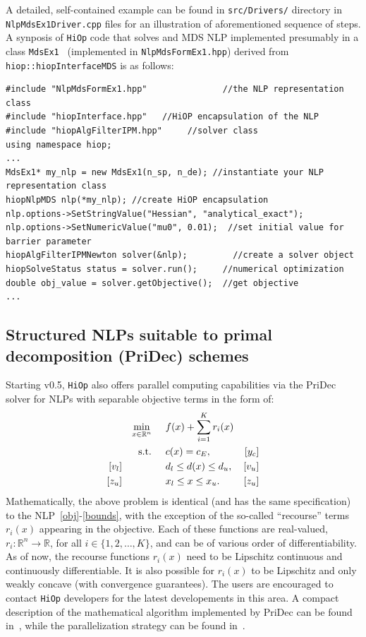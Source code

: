 \documentclass[11pt]{article}
\newcommand{\Hi}{\texttt{HiOp}\xspace}
\begin{document}
A detailed, self-contained example can be found in \texttt{src/Drivers/} directory in \texttt{NlpMdsEx1Driver.cpp} files for an illustration of aforementioned sequence of steps. A synposis of \Hi code that solves and MDS NLP implemented presumably in a class \texttt{MdsEx1 } (implemented in \texttt{NlpMdsFormEx1.hpp}) derived from \texttt{hiop::hiopInterfaceMDS} is as follows:
\begin{lstlisting}
#include "NlpMdsFormEx1.hpp"               //the NLP representation class
#include "hiopInterface.hpp"   //HiOP encapsulation of the NLP
#include "hiopAlgFilterIPM.hpp"     //solver class
using namespace hiop;
...
MdsEx1* my_nlp = new MdsEx1(n_sp, n_de); //instantiate your NLP representation class                    
hiopNlpMDS nlp(*my_nlp); //create HiOP encapsulation
nlp.options->SetStringValue("Hessian", "analytical_exact");
nlp.options->SetNumericValue("mu0", 0.01);  //set initial value for  barrier parameter
hiopAlgFilterIPMNewton solver(&nlp);         //create a solver object
hiopSolveStatus status = solver.run();     //numerical optimization
double obj_value = solver.getObjective();  //get objective
...
\end{lstlisting}


\subsection{Structured NLPs suitable to primal decomposition (PriDec) schemes}\label{sec:pridec}

Starting v0.5, \Hi also offers parallel computing capabilities via the PriDec solver for NLPs with separable objective terms in the form of:
\begin{align}
&&&&\min_{x\in\mathbb{R}^n} & \hspace{0.5cm} f(x) + \sum_{i=1}^K r_i(x) &&&& \label{prideobj}\\
&&&&\textnormal{s.t.} &\hspace{0.5cm}  c(x)=c_E,  &[y_c]&&&\\
&&[v_l]&&& \hspace{0.5cm} d_l \leq d(x) \leq d_u,  &[v_u]&&&\label{prideineq} \\
&&[z_u]&&& \hspace{0.5cm} x_l \leq x \leq x_u. & [z_u] &&&\label{pridebounds}
\end{align}
Mathematically, the above problem is identical (and has the same specification) to the NLP~\eqref{obj}-\eqref{bounds}, with the exception of the so-called ``recourse'' terms $r_i(x)$ appearing in the objective. Each of these functions are real-valued, $r_i:\mathbb{R}^n\rightarrow \mathbb{R}$, for all $i\in\{1,2,\ldots, K\}$, and can be of various order of differentiability. As of now, the recourse functions $r_i(x)$ need to be Lipschitz continuous and continuously differentiable.
It is also possible for $r_i(x)$ to be Lipschitz and only weakly concave (with convergence guarantees). The users are encouraged to contact \Hi developers for the latest developements in this area. A compact description of the mathematical algorithm implemented by PriDec can be found in~\cite{wang2023}, while the parallelization strategy can be found in~\cite{wang2021}.
\end{document}
